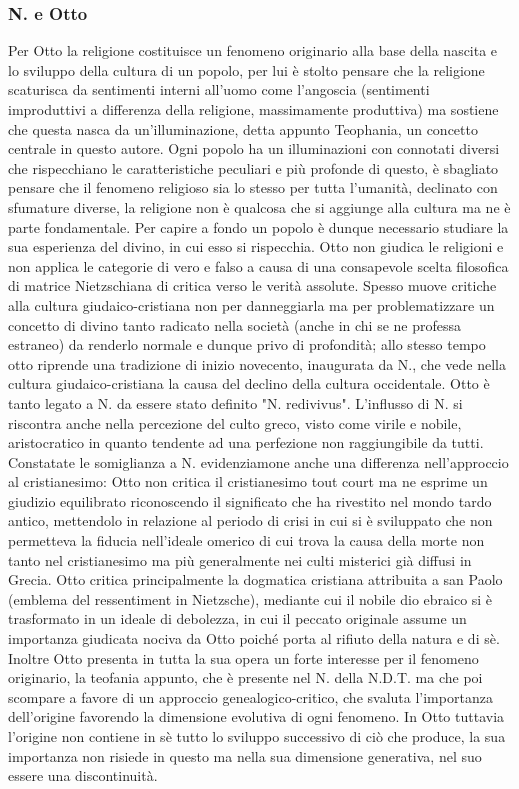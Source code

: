 \documentclass[10pt,a4paper]{article}
\begin{document}
\subsubsection{N. e Otto}
Per Otto la religione costituisce un fenomeno originario alla base della nascita e lo sviluppo della cultura di un popolo, per lui è stolto pensare che la religione scaturisca da sentimenti interni all'uomo come l'angoscia (sentimenti improduttivi a differenza della religione, massimamente produttiva) ma sostiene che questa nasca da un'illuminazione, detta appunto Teophania, un concetto centrale in questo autore. Ogni popolo ha un illuminazioni con connotati diversi che rispecchiano le caratteristiche peculiari e più profonde di questo, è sbagliato pensare che il fenomeno religioso sia lo stesso per tutta l'umanità, declinato con sfumature diverse, la religione non è qualcosa che si aggiunge alla cultura ma ne è parte fondamentale. Per capire a fondo un popolo è dunque necessario studiare la sua esperienza del divino, in cui esso si rispecchia. Otto non giudica le religioni e non applica le categorie di vero e falso a causa di una consapevole scelta filosofica di matrice Nietzschiana di critica verso le verità assolute. Spesso muove critiche alla cultura giudaico-cristiana non per danneggiarla ma per problematizzare un concetto di divino tanto radicato nella società (anche in chi se ne professa estraneo) da renderlo normale e dunque privo di profondità; allo stesso tempo otto riprende una tradizione di inizio novecento, inaugurata da N., che vede nella cultura giudaico-cristiana la causa del declino della cultura occidentale. Otto è tanto legato a N. da essere stato definito "N. redivivus". L'influsso di N. si riscontra anche nella percezione del culto greco, visto come virile e nobile, aristocratico in quanto tendente ad una perfezione non raggiungibile da tutti. Constatate le somiglianza a N. evidenziamone anche una differenza nell'approccio al cristianesimo: Otto non critica il cristianesimo tout court ma ne esprime un giudizio equilibrato riconoscendo il significato che ha rivestito nel mondo tardo antico, mettendolo in relazione al periodo di crisi in cui si è sviluppato che non permetteva la fiducia nell'ideale omerico di cui trova la causa della morte non tanto nel cristianesimo ma più generalmente nei culti misterici già diffusi in Grecia. Otto critica principalmente la dogmatica cristiana attribuita a san Paolo (emblema del ressentiment in Nietzsche), mediante cui il nobile dio ebraico si è trasformato in un ideale di debolezza, in cui il peccato originale assume un importanza giudicata nociva da Otto poiché porta al rifiuto della natura e di sè.\\
Inoltre Otto presenta in tutta la sua opera un forte interesse per il fenomeno originario, la teofania appunto, che è presente nel N. della N.D.T. ma che poi scompare a favore di un approccio genealogico-critico, che svaluta l'importanza dell'origine favorendo la dimensione evolutiva di ogni fenomeno. In Otto tuttavia l'origine non contiene in sè tutto lo sviluppo successivo di ciò che produce, la sua importanza non risiede in questo ma nella sua dimensione generativa, nel suo essere una discontinuità. 
\end{document}
